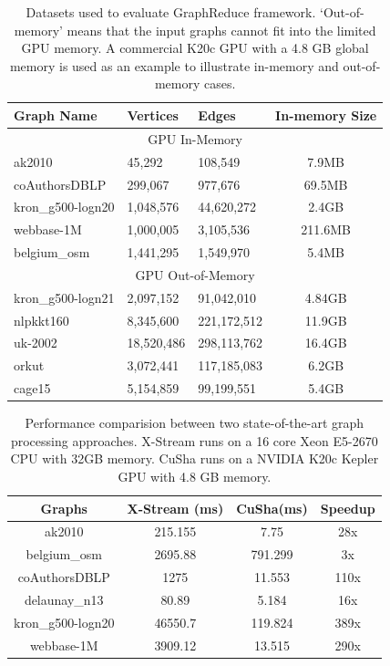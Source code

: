 \begin{table}[h]%
\centering
\begin{tabular}{lllc}
Graph Name & Vertices & Edges & \multicolumn{1}{l}{In-memory Size} \\ \hline
\multicolumn{4}{c}{GPU In-Memory} \\ \hline
ak2010\cite{ak2010}& 45,292 & 108,549 & 7.9MB \\
coAuthorsDBLP\cite{coauthors} & 299,067 & 977,676 & 69.5MB \\
kron\_g500-logn20\cite{kron20} & 1,048,576 & 44,620,272 & 2.4GB \\
webbase-1M\cite{web} & 1,000,005 & 3,105,536 & 211.6MB \\
belgium\_osm\cite{belgium} & 1,441,295 & 1,549,970 & 5.4MB \\ \hline
\multicolumn{4}{c}{GPU Out-of-Memory} \\ \hline
kron\_g500-logn21\cite{kron20} & 2,097,152 & 91,042,010 & 4.84GB \\
nlpkkt160\cite{nlpktt} & 8,345,600 & 221,172,512 & 11.9GB \\
uk-2002\cite{uk2002} & 18,520,486 & 298,113,762 & 16.4GB \\
orkut\cite{orkut}& 3,072,441 & 117,185,083 & 6.2GB \\
cage15\cite{cage15} & 5,154,859 & 99,199,551 & 5.4GB
\end{tabular}
\caption{ Datasets used to evaluate GraphReduce framework. `Out-of-memory' means that the input graphs cannot fit into the limited GPU memory. A commercial K20c GPU with a 4.8 GB global memory is used as an example to illustrate in-memory and out-of-memory cases.}
\label{datasets}
\end{table}




\begin{table}[h]%
\centering
\begin{tabular}{cccc}
\hline
Graphs & X-Stream (ms) & CuSha(ms) & \multicolumn{1}{l}{Speedup} \\ \hline
ak2010 & 215.155 & 7.75 & 28x \\
belgium\_osm & 2695.88 & 791.299 & 3x \\
coAuthorsDBLP & 1275 & 11.553 & 110x \\
delaunay\_n13 & 80.89 & 5.184 & 16x \\
kron\_g500-logn20 & 46550.7 & 119.824 & 389x \\
webbase-1M & 3909.12 & 13.515 & 290x
\end{tabular}
\caption{Performance comparision between two state-of-the-art graph processing approaches. X-Stream runs on a 16 core Xeon E5-2670 CPU with 32GB memory. CuSha runs on a NVIDIA K20c Kepler GPU with 4.8 GB memory. }
\label{gpu-cpu}
\end{table}


